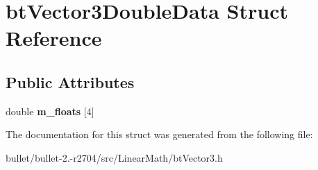 \hypertarget{structbt_vector3_double_data}{\section{bt\+Vector3\+Double\+Data Struct Reference}
\label{structbt_vector3_double_data}
}
\subsection*{Public Attributes}
\begin{DoxyCompactItemize}
\item 
\hypertarget{structbt_vector3_double_data_a69c991016e883f0320d5c646f56d243e}{double {\bfseries m\+\_\+floats} \mbox{[}4\mbox{]}}\label{structbt_vector3_double_data_a69c991016e883f0320d5c646f56d243e}

\end{DoxyCompactItemize}


The documentation for this struct was generated from the following file\+:\begin{DoxyCompactItemize}
\item 
bullet/bullet-\/2.-\/r2704/src/\+Linear\+Math/bt\+Vector3.\+h\end{DoxyCompactItemize}
